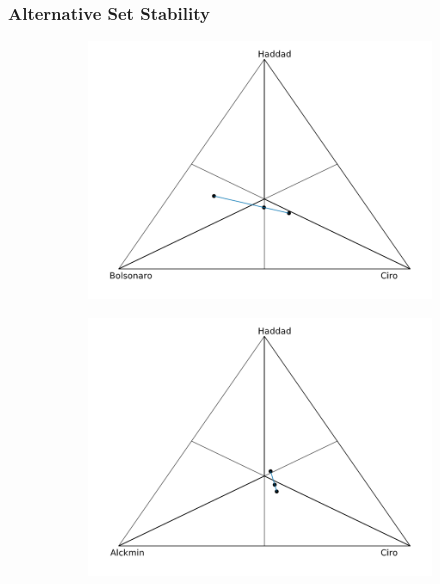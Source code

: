 \documentclass{beamer}
\begin{document}
\begin{frame}
  \frametitle{Alternative Set Stability }

   \begin{figure}[!h] \centering
        \begin{subfigure}[b]{0.45\textwidth} \centering
\includegraphics[width=\textwidth]{../images/cw1_nota.png}

        \end{subfigure} \hfill
        \begin{subfigure}[b]{0.45\textwidth} \centering
\includegraphics[width=\textwidth]{../images/cw1_notb.png}


\end{subfigure}
\end{figure}
\end{frame}
\end{document}
